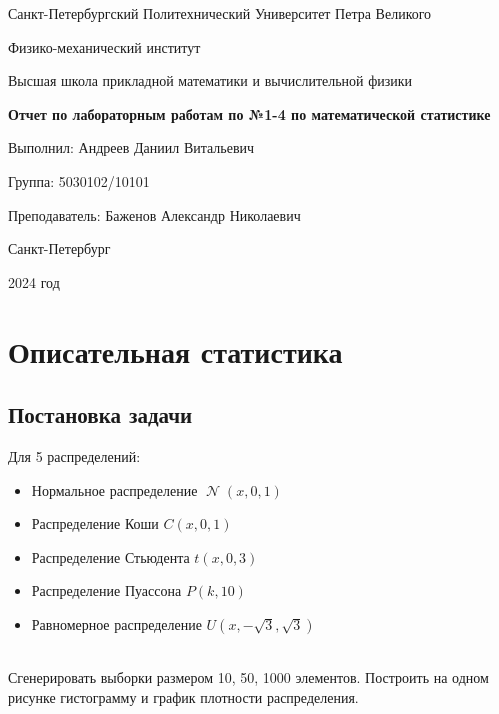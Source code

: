 \documentclass[14pt]{extarticle}
\DeclareMathOperator{\normal}{\mathcal{N}} %
\begin{document}
\pagestyle{empty}
\begin{center}
    Санкт-Петербургский Политехнический Университет Петра Великого
    
    \vspace{0.3cm}
    
    Физико-механический институт

    \vspace{0.3cm}
    
    Высшая школа прикладной математики и вычислительной физики
    
    \vspace{3cm}
    
    {\large\textbf{Отчет по лабораторным работам по №1-4 по математической статистике}}

    \vspace{4.5cm}
    
    Выполнил: \hspace{5.5cm}Андреев Даниил Витальевич
    
    Группа: \hspace{9.5cm}5030102/10101
    
    Преподаватель: \hspace{3.6cm}Баженов Александр Николаевич
    
    \vspace{4cm}
    
    Санкт-Петербург
    
    2024 год
\end{center}

\newpage

\section{Описательная статистика}
\subsection{Постановка задачи}
Для 5 распределений:

\begin{itemize}
    \item Нормальное распределение \(\normal{(x, 0, 1)}\) 
    \item Распределение Коши \(C(x, 0, 1)\) 
    \item Распределение Стьюдента \(t(x, 0, 3)\) 
    \item Распределение Пуассона \(P(k, 10)\) 
    \item Равномерное распределение \(U(x,-\sqrt{3}, \sqrt{3})\) 
\end{itemize}\\
Сгенерировать выборки размером 10, 50, 1000 элементов. Построить на одном рисунке гистограмму и график плотности распределения.
\end{document}
